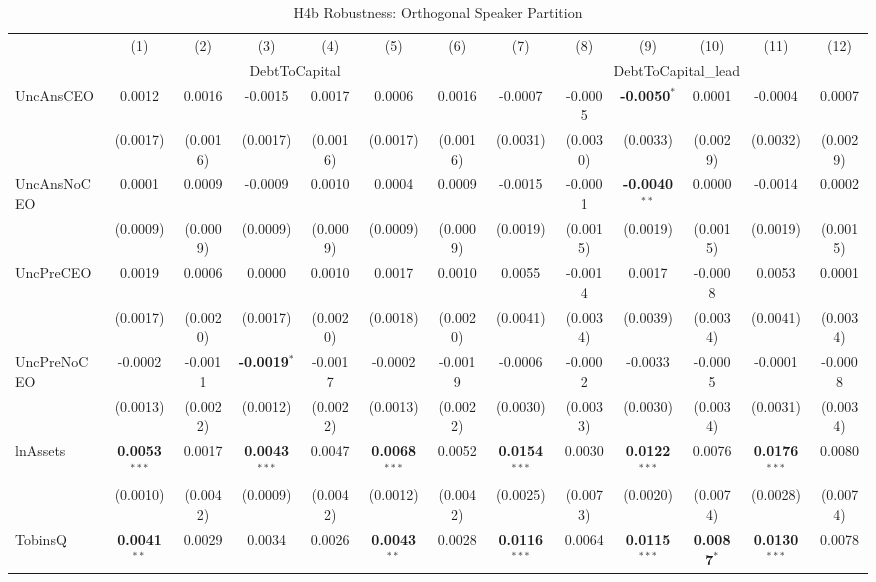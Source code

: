 \documentclass[11pt,a4paper]{article}
\begin{document}
\clearpage
\begin{table}[htbp]
\centering
\caption{H4b Robustness: Orthogonal Speaker Partition}
\label{tab:h4b_robust}
\scriptsize
\begin{tabular}{lcccccccccccc}
\toprule
 & (1) & (2) & (3) & (4) & (5) & (6) & (7) & (8) & (9) & (10) & (11) & (12) \\
 & \multicolumn{6}{c}{DebtToCapital} & \multicolumn{6}{c}{DebtToCapital\_lead} \\
\cmidrule(lr){2-7} \cmidrule(lr){8-13}
\midrule
UncAnsCEO & 0.0012 & 0.0016 & -0.0015 & 0.0017 & 0.0006 & 0.0016 & -0.0007 & -0.0005 & \textbf{-0.0050}$^{*}$ & 0.0001 & -0.0004 & 0.0007 \\
 & (0.0017) & (0.0016) & (0.0017) & (0.0016) & (0.0017) & (0.0016) & (0.0031) & (0.0030) & (0.0033) & (0.0029) & (0.0032) & (0.0029) \\
UncAnsNoCEO & 0.0001 & 0.0009 & -0.0009 & 0.0010 & 0.0004 & 0.0009 & -0.0015 & -0.0001 & \textbf{-0.0040}$^{**}$ & 0.0000 & -0.0014 & 0.0002 \\
 & (0.0009) & (0.0009) & (0.0009) & (0.0009) & (0.0009) & (0.0009) & (0.0019) & (0.0015) & (0.0019) & (0.0015) & (0.0019) & (0.0015) \\
UncPreCEO & 0.0019 & 0.0006 & 0.0000 & 0.0010 & 0.0017 & 0.0010 & 0.0055 & -0.0014 & 0.0017 & -0.0008 & 0.0053 & 0.0001 \\
 & (0.0017) & (0.0020) & (0.0017) & (0.0020) & (0.0018) & (0.0020) & (0.0041) & (0.0034) & (0.0039) & (0.0034) & (0.0041) & (0.0034) \\
UncPreNoCEO & -0.0002 & -0.0011 & \textbf{-0.0019}$^{*}$ & -0.0017 & -0.0002 & -0.0019 & -0.0006 & -0.0002 & -0.0033 & -0.0005 & -0.0001 & -0.0008 \\
 & (0.0013) & (0.0022) & (0.0012) & (0.0022) & (0.0013) & (0.0022) & (0.0030) & (0.0033) & (0.0030) & (0.0034) & (0.0031) & (0.0034) \\
\midrule
lnAssets & \textbf{0.0053}$^{***}$ & 0.0017 & \textbf{0.0043}$^{***}$ & 0.0047 & \textbf{0.0068}$^{***}$ & 0.0052 & \textbf{0.0154}$^{***}$ & 0.0030 & \textbf{0.0122}$^{***}$ & 0.0076 & \textbf{0.0176}$^{***}$ & 0.0080 \\
 & (0.0010) & (0.0042) & (0.0009) & (0.0042) & (0.0012) & (0.0042) & (0.0025) & (0.0073) & (0.0020) & (0.0074) & (0.0028) & (0.0074) \\
TobinsQ & \textbf{0.0041}$^{**}$ & 0.0029 & 0.0034 & 0.0026 & \textbf{0.0043}$^{**}$ & 0.0028 & \textbf{0.0116}$^{***}$ & 0.0064 & \textbf{0.0115}$^{***}$ & \textbf{0.0087}$^{*}$ & \textbf{0.0130}$^{***}$ & 0.0078 \\

\end{tabular}
\end{table}
\end{document}
